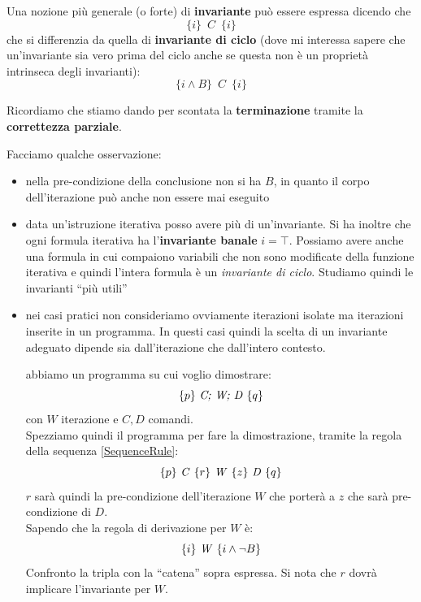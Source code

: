			\begin{definizione}
				Una nozione più generale (o forte) di \textbf{invariante} può essere espressa dicendo che
				\[\{i\}\,\,\, C\,\,\,\{i\}\]
				che si differenzia da quella di \textbf{invariante di ciclo} (dove mi
				interessa sapere che un'invariante sia vero prima del ciclo anche se questa
				non è un proprietà intrinseca degli invarianti):
				\[\{i\land B\}\,\,\, C\,\,\,\{i\}\]
			\end{definizione} \vspace{5mm} %
			\begin{nota}
			Ricordiamo che stiamo dando per scontata la \textbf{terminazione} tramite la
			\textbf{correttezza parziale}.
			\end{nota}
			Facciamo qualche osservazione:
			\begin{itemize}
				\item nella pre-condizione della conclusione non si ha $B$, in quanto il
				      corpo dell'iterazione può anche non essere mai eseguito
				\item data un'istruzione iterativa posso avere più di un'invariante. Si ha
				      inoltre che ogni formula iterativa ha l'\textbf{invariante banale}
				      $i=\top$. Possiamo avere anche una formula in cui compaiono variabili che
				      non sono modificate della funzione iterativa e quindi l'intera formula è un
				      \textit{invariante di ciclo}. Studiamo quindi le invarianti ``più utili''
				\item nei casi pratici non consideriamo ovviamente iterazioni isolate ma
				      iterazioni inserite in un programma. In questi casi quindi la scelta di un
				      invariante adeguato dipende sia dall'iterazione che dall'intero contesto.
				      \begin{esempio}
				      	abbiamo un programma su cui voglio dimostrare:
				      	\[\{p\}\mbox{ \textit{C; W; D} }\{q\}\]
				      	con $W$ iterazione e $C, D$ comandi.\\
				      	Spezziamo quindi il programma per fare la dimostrazione, tramite la regola
				      	della sequenza \ref{SequenceRule}:
				      	\[\{p\}\mbox{ \textit{C} }\{r\}\mbox{ \textit{W} }\{z\}\mbox{ \textit{D}
				      			}\{q\}\]
				      		$r$ sarà quindi la pre-condizione dell'iterazione $W$ che porterà a $z$ che
				      		sarà pre-condizione di $D$.\\
				      		Sapendo che la regola di derivazione per $W$ è:
				      		\[\{i\}\mbox{ \textit{W} }\{i\land\neg B\}\]
				      		Confronto la tripla con la ``catena'' sopra espressa. Si nota che $r$
				      		dovrà implicare l'invariante per $W$.
				      		\end{esempio}
				      		\end{itemize}
